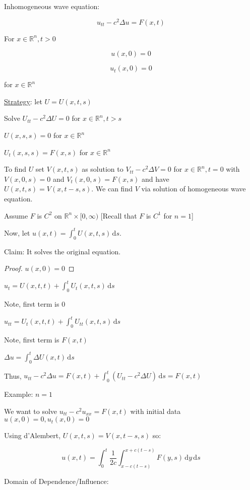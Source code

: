 \documentclass{article}
\theoremstyle{definition}
\begin{document}
Inhomogeneous wave equation:

\[
    u_{t t} - c^2 \Delta u = F(x,t)
\]

For \(x\in\mathbb{R}^n, t>0\) 

\[
    u(x,0) = 0
\]

\[
    u_t(x,0) = 0
\]

for \(x\in\mathbb{R}^n\) 

\underline{Strategy}: let \(U = U(x,t,s)\)

Solve \(U_{t t} - c^2 \Delta U = 0\) for \(x\in\mathbb{R}^n, t>s\)

\(U(x,s,s) = 0\) for \(x\in\mathbb{R}^n\) 

\(U_t(x,s,s)=F(x,s)\) for \(x\in\mathbb{R}^n\) 

To find \(U\) set \(V(x,t,s)\) as solution to \(V_{t t} - c^2 \Delta V = 0\) for \(x\in\mathbb{R}^n, t=0\) with \(V(x,0,s)=0\) and \(V_t(x,0,s)=F(x,s)\) and have \(U(x,t,s)=V(x,t-s,s)\). We can find \(V\) via solution of homogeneous wave equation.

Assume \(F\) is \(C^2\) on \(\mathbb{R}^n \times [0,\infty)\) [Recall that \(F\) is \(C^1\) for \(n = 1\)]

Now, let \(u(x,t) = \int_0^t U(x,t,s)\,\mathrm{d}s\).

Claim: It solves the original equation.

\begin{proof}
    \(u(x,0) = 0\) 
\end{proof}

\(u_t = U(x,t,t) + \int_0^t U_t(x,t,s)\,\mathrm{d}s\) 

Note, first term is \(0\) 

\(u_{t t} = U_t (x,t,t) + \int_0^t U_{t t}(x,t,s)\,\mathrm{d}s\) 

Note, first term is \(F(x,t)\) 

\(\Delta u = \int_0^t \Delta U(x,t)\,\mathrm{d}s\) 

Thus, \(u_{t t} - c^2 \Delta u = F(x,t) + \int_0^t (U_{t t}-c^2\Delta U)\,\mathrm{d}s = F(x,t)\) 

Example: \(n = 1\) 

We want to solve \(u_{t t} - c^2 u_{x x} = F(x,t)\) with initial data \(u(x,0)=0, u_t(x,0)=0\) 

Using d'Alembert, \(U(x,t,s)=V(x,t-s,s)\) so:

\[
    u(x,t) = \int_0^t \frac{1}{2c}\int_{x - c(t-s)}^{x+c(t-s)} F(y,s)\,\mathrm{d}y\,\mathrm{d}s
\]

Domain of Dependence/Influence: 
\end{document}
